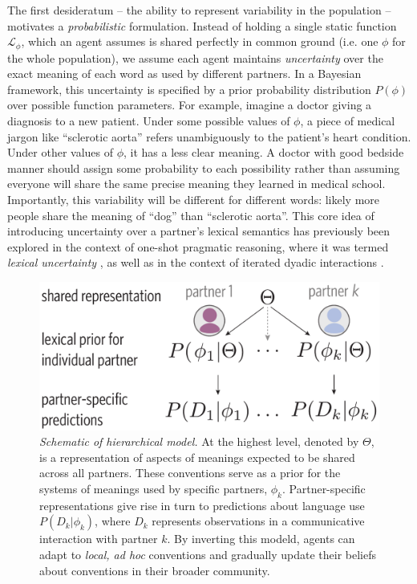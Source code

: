 The first desideratum -- the ability to represent variability in the population -- motivates a \emph{probabilistic} formulation.
Instead of holding a single static function $\mathcal{L}_{\phi}$, which an agent assumes is shared perfectly in common ground (i.e. one $\phi$ for the whole population), we assume each agent maintains \emph{uncertainty} over the exact meaning of each word as used by different partners.
In a Bayesian framework, this uncertainty is specified by a prior probability distribution $P(\phi)$ over possible function parameters.
For example, imagine a doctor giving a diagnosis to a new patient.
Under some possible values of $\phi$, a piece of medical jargon like ``sclerotic aorta'' refers unambiguously to the patient's heart condition.
Under other values of $\phi$, it has a less clear meaning. 
A doctor with good bedside manner should assign some probability to each possibility rather than assuming everyone will share the same precise meaning they learned in medical school. 
Importantly, this variability will be different for different words: likely more people share the meaning of ``dog'' than ``sclerotic aorta''.
This core idea of introducing uncertainty over a partner's lexical semantics has previously been explored in the context of one-shot pragmatic reasoning, where it was termed \emph{lexical uncertainty} \cite{bergen_pragmatic_2016}, as well as in the context of iterated dyadic interactions \cite{SmithGoodmanFrank13_RecursivePragmaticReasoningNIPS}. 

\begin{figure}[b!]
\centering
\includegraphics[scale=0.35]{./figures/task1_model.pdf}
\vspace{.5em}
\caption{\emph{Schematic of hierarchical model.} At the highest level, denoted by $\Theta$, is a representation of aspects of meanings expected to be shared across all partners. These conventions serve as a prior for the systems of meanings used by specific partners, $\phi_k$. Partner-specific representations give rise in turn to predictions about language use $P(D_k|\phi_k)$, where $D_k$ represents observations in a communicative interaction with partner $k$. By inverting this modeld, agents can adapt to \emph{local, ad hoc} conventions and gradually update their beliefs about conventions in their broader community.}
\label{fig:model_schematic}
\end{figure}

